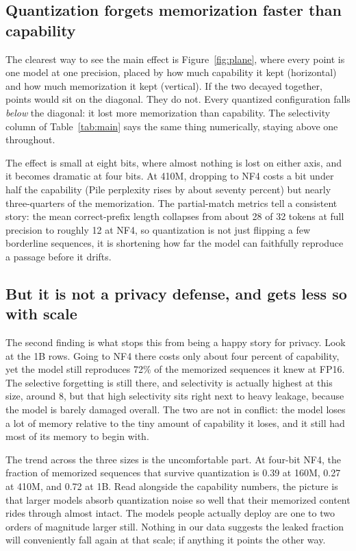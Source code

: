\documentclass{article}
\begin{document}
\subsection{Quantization forgets memorization faster than capability}

The clearest way to see the main effect is Figure~\ref{fig:plane}, where
every point is one model at one precision, placed by how much capability it
kept (horizontal) and how much memorization it kept (vertical). If the two
decayed together, points would sit on the diagonal. They do not. Every
quantized configuration falls \emph{below} the diagonal: it lost more
memorization than capability. The selectivity column of Table~\ref{tab:main}
says the same thing numerically, staying above one throughout.

The effect is small at eight bits, where almost nothing is lost on either
axis, and it becomes dramatic at four bits. At 410M, dropping to NF4 costs
a bit under half the capability (Pile perplexity rises by about seventy
percent) but nearly three-quarters of the memorization. The partial-match metrics tell a
consistent story: the mean correct-prefix length collapses from about 28 of
32 tokens at full precision to roughly 12 at NF4, so quantization is not just
flipping a few borderline sequences, it is shortening how far the model can
faithfully reproduce a passage before it drifts.

\subsection{But it is not a privacy defense, and gets less so with scale}

The second finding is what stops this from being a happy story for privacy.
Look at the 1B rows. Going to NF4 there costs only about four percent of
capability, yet the model still reproduces 72\% of the memorized sequences it
knew at FP16. The selective forgetting is still there, and selectivity is
actually highest at this size, around 8, but that high selectivity sits right
next to heavy leakage, because the model is barely damaged overall. The two
are not in conflict: the model loses a lot of memory relative to the tiny
amount of capability it loses, and it still had most of its memory to begin
with.

The trend across the three sizes is the uncomfortable part. At four-bit NF4,
the fraction of memorized sequences that survive quantization is 0.39 at
160M, 0.27 at 410M, and 0.72 at 1B. Read alongside the capability numbers,
the picture is that larger models absorb quantization noise so well that
their memorized content rides through almost intact. The models people
actually deploy are one to two orders of magnitude larger still. Nothing in
our data suggests the leaked fraction will conveniently fall again at that
scale; if anything it points the other way.
\end{document}
